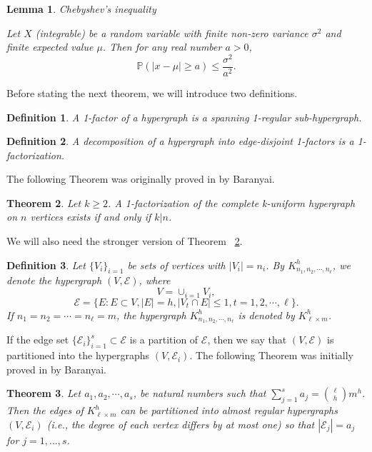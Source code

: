 \documentclass[reqno,11pt]{amsart}
\newtheorem{theorem}{Theorem}
\newtheorem{lemma}[theorem]{Lemma}
\newtheorem{definition}{Definition}
\renewcommand{\leq}{\leqslant}
\renewcommand{\geq}{\geqslant}
\begin{document}
\begin{lemma} Chebyshev's inequality

Let $X$ (integrable) be a random variable with finite non-zero variance $\sigma^2$ and finite expected value $\mu$. Then for any real number $a >0$, 
$$\mathbb{P}(|x-\mu| \geq a) \leq \frac{\sigma^2}{a^2}.$$
    
\end{lemma}


Before stating the next theorem, we will introduce two definitions.
\begin{definition}
   A 1-factor of a hypergraph is a spanning 1-regular sub-hypergraph.  
\end{definition} 

\begin{definition}
 A decomposition of a hypergraph into edge-disjoint 1-factors is a 1-factorization.   
\end{definition}
The following Theorem was originally proved in \cite{Zsolt} by Baranyai.
\begin{theorem} \label{theorem: Baranyai1}
  Let $k \geq 2$. A 1-factorization of the complete k-uniform hypergraph on $n$ vertices exists if and only if $k|n$.  
\end{theorem}

We will also need the stronger version of Theorem ~\ref{theorem: Baranyai1}. 
\begin{definition}
Let $\{V_i\}_{i=1}$ be sets of vertices with $|V_i|=n_i$. By $K_{n_1,n_2,\cdots,n_\ell}^h$, we denote the hypergraph $(V,\mathscr{E})$, where $$V=\cup_{i=1} V_i,$$
$$\mathscr{E}=\{E: E \subset V,|E|=h, |V_t \cap E| \leq 1, t=1,2,\cdots, \ell \}.$$
If $n_1=n_2=\cdots=n_{\ell}=m$, the hypergraph $K_{n_1,n_2,\cdots,n_\ell}^h$ is denoted by $K_{\ell\times m}^h$.
\end{definition}

If the edge set $\{\mathscr{E}_i\}_{i=1}^s \subset \mathscr{E}$ is a partition of $\mathscr{E}$, then we say that $(V, \mathscr{E})$ is partitioned into the hypergraphs $(V,\mathscr{E}_i)$. The following Theorem was initially proved in \cite{Zsolt2} by Baranyai. 
\begin{theorem} \label{theorem: Baranyai2}
Let $a_1,a_2,\cdots,a_s$, be natural numbers such that $\sum_{j=1}^sa_j = \binom{\ell}{h}m^h$. Then the edges of $K_{\ell \times m}^h$ can be partitioned into almost regular hypergraphs $(V,\mathscr{E}_i)$ (i.e., the degree of each vertex differs by at most one) so that  $|\mathscr{E}_j|= a_j$ for $j = 1,..., s$.
\end{theorem}
\end{document}
